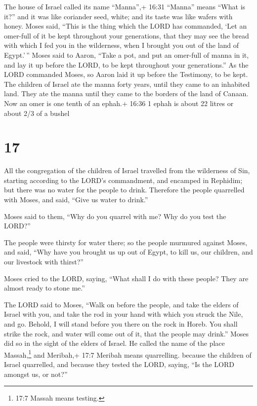  The house of Israel called its name ``Manna'',+ 16:31
``Manna'' means ``What is it?'' and it was like coriander seed, white;
and its taste was like wafers with honey.  Moses said,
``This is the thing which the LORD has commanded, `Let an omer-full of
it be kept throughout your generations, that they may see the bread with
which I fed you in the wilderness, when I brought you out of the land of
Egypt.'\,''  Moses said to Aaron, ``Take a pot, and put an
omer-full of manna in it, and lay it up before the LORD, to be kept
throughout your generations.''  As the LORD commanded
Moses, so Aaron laid it up before the Testimony, to be kept.
 The children of Israel ate the manna forty years, until
they came to an inhabited land. They ate the manna until they came to
the borders of the land of Canaan.  Now an omer is one
tenth of an ephah.+ 16:36 1 ephah is about 22 litres or about 2/3 of a
bushel

\hypertarget{section-16}{%
\section{17}\label{section-16}}

 All the congregation of the children of Israel travelled
from the wilderness of Sin, starting according to the LORD's
commandment, and encamped in Rephidim; but there was no water for the
people to drink.  Therefore the people quarrelled with
Moses, and said, ``Give us water to drink.''

Moses said to them, ``Why do you quarrel with me? Why do you test the
LORD?''

 The people were thirsty for water there; so the people
murmured against Moses, and said, ``Why have you brought us up out of
Egypt, to kill us, our children, and our livestock with thirst?''

 Moses cried to the LORD, saying, ``What shall I do with
these people? They are almost ready to stone me.''

 The LORD said to Moses, ``Walk on before the people, and
take the elders of Israel with you, and take the rod in your hand with
which you struck the Nile, and go.  Behold, I will stand
before you there on the rock in Horeb. You shall strike the rock, and
water will come out of it, that the people may drink.'' Moses did so in
the sight of the elders of Israel.  He called the name of
the place Massah,\footnote{17:7 Massah means testing.} and Meribah,+
17:7 Meribah means quarrelling. because the children of Israel
quarrelled, and because they tested the LORD, saying, ``Is the LORD
amongst us, or not?''

